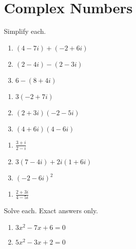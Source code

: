 \chapter{Complex Numbers}

Simplify each.

\begin{multicols}{3}
\begin{enumerate}
	\item $(4-7i)+(-2+6i)$
	\item $(2-4i)-(2-3i)$
	\item $6 - (8 + 4i)$
\end{enumerate}	\setcounter{Review}{\value{enumi}}
\end{multicols}

\begin{multicols}{3}
\begin{enumerate}		\setcounter{enumi}{\value{Review}}
	\item $3(-2 + 7i)$
	\item $(2+3i)(-2-5i)$
	\item $(4+6i)(4-6i)$
\end{enumerate}	\setcounter{Review}{\value{enumi}}
\end{multicols}

\begin{multicols}{3}
\begin{enumerate}		\setcounter{enumi}{\value{Review}}
	\item $\frac{3+i}{2-i}$
	\item $3(7-4i)+2i(1+6i)$
	\item $(-2-6i)^2$
\end{enumerate}	\setcounter{Review}{\value{enumi}}
\end{multicols}

\begin{multicols}{3}
\begin{enumerate}		\setcounter{enumi}{\value{Review}}
	\item $\frac{2+3i}{4-5i}$
\end{enumerate}	\setcounter{Review}{\value{enumi}}
\end{multicols}

Solve each. Exact answers only.
\begin{multicols}{3}
\begin{enumerate}		\setcounter{enumi}{\value{Review}}
	\item $3x^2-7x+6=0$
	\item $5x^2-3x+2=0$
\end{enumerate}	\setcounter{Review}{\value{enumi}}
\end{multicols}

